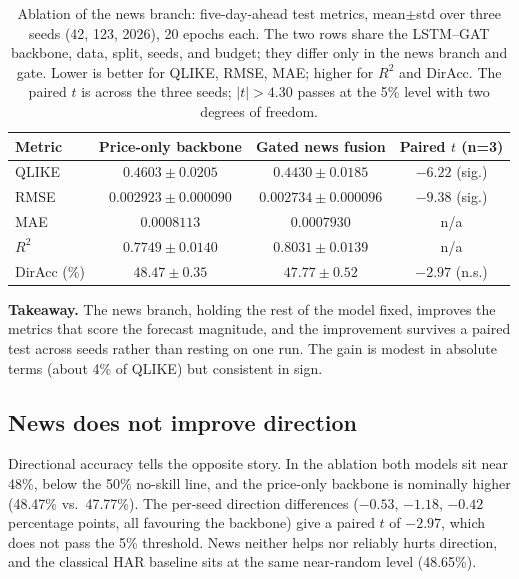 \documentclass[runningheads]{llncs}
\newcommand{\diraccHARc}{48.65}
\newcommand{\diraccBB}{48.47}
\newcommand{\diraccNews}{47.77}
\newcommand{\diracctstat}{-2.97}
\begin{document}
\begin{table}[t]
\caption{Ablation of the news branch: five-day-ahead test metrics, mean$\pm$std over three seeds
(42, 123, 2026), 20 epochs each. The two rows share the LSTM--GAT backbone, data, split, seeds, and
budget; they differ only in the news branch and gate. Lower is better for QLIKE, RMSE, MAE; higher
for $R^2$ and DirAcc. The paired $t$ is across the three seeds; $|t|>4.30$ passes at the 5\% level
with two degrees of freedom.}
\label{tab:ablation}
\centering
\begin{tabular}{lccc}
\toprule
Metric & Price-only backbone & Gated news fusion & Paired $t$ (n=3) \\
\midrule
QLIKE            & $0.4603\pm0.0205$   & $\mathbf{0.4430\pm0.0185}$   & $-6.22$ (sig.) \\
RMSE             & $0.002923\pm0.000090$ & $\mathbf{0.002734\pm0.000096}$ & $-9.38$ (sig.) \\
MAE              & $0.0008113$         & $\mathbf{0.0007930}$         & n/a \\
$R^2$            & $0.7749\pm0.0140$   & $\mathbf{0.8031\pm0.0139}$   & n/a \\
DirAcc (\%)      & $\mathbf{48.47\pm0.35}$ & $47.77\pm0.52$           & $-2.97$ (n.s.) \\
\bottomrule
\end{tabular}
\end{table}

\smallskip
\noindent\textbf{Takeaway.} The news branch, holding the rest of the model fixed, improves the
metrics that score the forecast magnitude, and the improvement survives a paired test across seeds
rather than resting on one run. The gain is modest in absolute terms (about 4\% of QLIKE) but
consistent in sign.

\subsection{News does not improve direction}
Directional accuracy tells the opposite story. In the ablation both models sit near 48\%, below the
50\% no-skill line, and the price-only backbone is nominally higher (\diraccBB\% vs.\ \diraccNews\%).
The per-seed direction differences ($-0.53$, $-1.18$, $-0.42$ percentage points, all favouring the
backbone) give a paired $t$ of $\diracctstat$, which does not pass the 5\% threshold. News neither
helps nor reliably hurts direction, and the classical HAR baseline sits at the same near-random
level (\diraccHARc\%).
\end{document}
